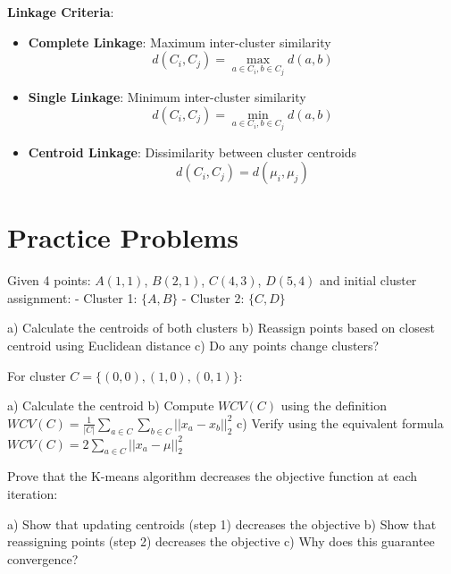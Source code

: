\documentclass{article}
\newcounter{exercise}
\begin{document}
\textbf{Linkage Criteria}:
\begin{itemize}
    \item \textbf{Complete Linkage}: Maximum inter-cluster similarity
    $$d(C_i, C_j) = \max_{a \in C_i, b \in C_j} d(a,b)$$
    \item \textbf{Single Linkage}: Minimum inter-cluster similarity  
    $$d(C_i, C_j) = \min_{a \in C_i, b \in C_j} d(a,b)$$
    \item \textbf{Centroid Linkage}: Dissimilarity between cluster centroids
    $$d(C_i, C_j) = d(\mu_i, \mu_j)$$
\end{itemize}

\section{Practice Problems}

\begin{tcolorbox}[colback=gray!5!white,colframe=gray!75!black,title=Problem \stepcounter{exercise}: Basic K-Means Calculation]

Given 4 points: $A(1,1)$, $B(2,1)$, $C(4,3)$, $D(5,4)$ and initial cluster assignment:
- Cluster 1: $\{A, B\}$
- Cluster 2: $\{C, D\}$

a) Calculate the centroids of both clusters
b) Reassign points based on closest centroid using Euclidean distance
c) Do any points change clusters?
\end{tcolorbox}

\begin{tcolorbox}[colback=gray!5!white,colframe=gray!75!black,title=Problem \stepcounter{exercise}: Within-Cluster Variation]

For cluster $C = \{(0,0), (1,0), (0,1)\}$:

a) Calculate the centroid
b) Compute $WCV(C)$ using the definition $WCV(C) = \frac{1}{|C|}\sum_{a \in C}\sum_{b \in C}||x_a - x_b||_2^2$
c) Verify using the equivalent formula $WCV(C) = 2\sum_{a \in C} ||x_a - \mu||_2^2$
\end{tcolorbox}

\begin{tcolorbox}[colback=gray!5!white,colframe=gray!75!black,title=Problem \stepcounter{exercise}: K-Means Convergence]

Prove that the K-means algorithm decreases the objective function at each iteration:

a) Show that updating centroids (step 1) decreases the objective
b) Show that reassigning points (step 2) decreases the objective  
c) Why does this guarantee convergence?
\end{tcolorbox}
\end{document}
